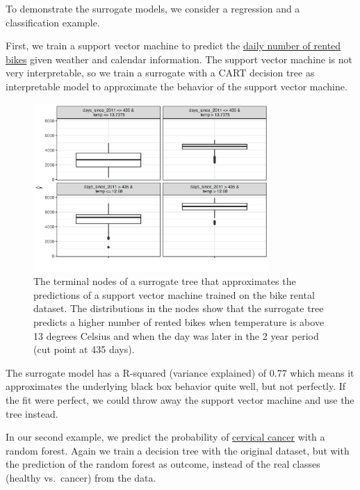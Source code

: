 \documentclass[
  11pt,
]{scrbook}
\begin{document}
To demonstrate the surrogate models, we consider a regression and a classification example.

First, we train a support vector machine to predict the \protect\hyperlink{bike-data}{daily number of rented bikes} given weather and calendar information.
The support vector machine is not very interpretable, so we train a surrogate with a CART decision tree as interpretable model to approximate the behavior of the support vector machine.

\begin{figure}

{\centering \includegraphics[width=0.8\textwidth]{images/surrogate-bike-1} 

}

\caption{The terminal nodes of a surrogate tree that approximates the predictions of a support vector machine trained on the bike rental dataset. The distributions in the nodes show that the surrogate tree predicts a higher number of rented bikes when temperature is above 13 degrees Celsius and when the day was later in the 2 year period (cut point at 435 days).}\label{fig:surrogate-bike}
\end{figure}

The surrogate model has a R-squared (variance explained) of 0.77 which means it approximates the underlying black box behavior quite well, but not perfectly.
If the fit were perfect, we could throw away the support vector machine and use the tree instead.

In our second example, we predict the probability of \protect\hyperlink{cervical}{cervical cancer} with a random forest.
Again we train a decision tree with the original dataset, but with the prediction of the random forest as outcome, instead of the real classes (healthy vs.~cancer) from the data.
\end{document}
